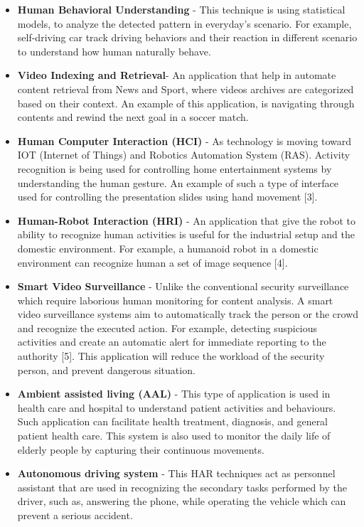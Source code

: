 \begin{itemize}
\item \textbf{Human Behavioral Understanding} - This technique is  using statistical models, to analyze the detected pattern in everyday's scenario. For example, self-driving car track driving behaviors and their reaction in different scenario to understand how human naturally behave.
\item \textbf{Video Indexing and Retrieval}- An application that help in automate content retrieval from News and Sport, where videos archives are categorized based on their context. An example of this application, is navigating through contents and rewind the next goal in a soccer match.
\item \textbf{Human Computer Interaction (HCI)} - As technology is moving toward IOT (Internet of Things) and Robotics Automation System (RAS). Activity recognition is being used for controlling home entertainment systems by understanding the human gesture. An example of such a type of interface used for controlling the presentation slides using hand movement [3].
\item \textbf{Human-Robot Interaction (HRI)} - An application that give the robot to ability to recognize human activities is useful for the industrial setup and the domestic environment. For example, a humanoid robot in a domestic environment can recognize human a set of image sequence [4]. 
\item \textbf{Smart Video Surveillance} - Unlike the conventional security surveillance which require laborious human monitoring for content analysis. A smart video surveillance systems aim to automatically track the person or the crowd and recognize the executed action. For example, detecting suspicious activities and create an automatic alert for immediate reporting to the authority [5]. This application will reduce the workload of the security person, and prevent dangerous situation.
\item \textbf{Ambient assisted living (AAL)} - This type of application is used in health care and hospital to understand patient activities and behaviours. Such application can facilitate health treatment, diagnosis, and general patient health care. This system is also used to monitor the daily life of elderly people by capturing their continuous movements.
\item \textbf{Autonomous driving system} - This HAR techniques act as personnel assistant that are used in recognizing the secondary tasks performed by the driver, such as, answering the phone, while operating the vehicle which can prevent a serious accident.  
\end{itemize}

